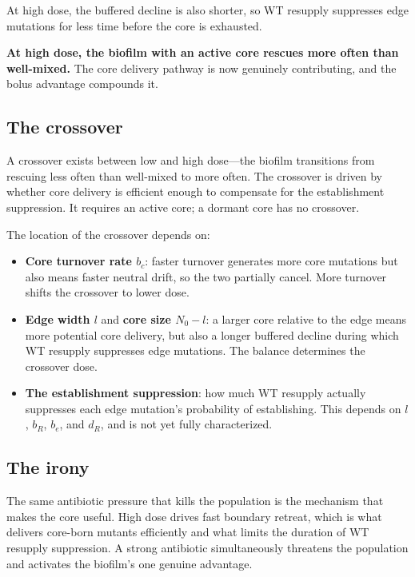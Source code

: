 \documentclass[12pt]{article}
\begin{document}
At high dose, the buffered decline is also shorter, so WT resupply suppresses
edge mutations for less time before the core is exhausted.

\textbf{At high dose, the biofilm with an active core rescues more often
than well-mixed.} The core delivery pathway is now genuinely contributing,
and the bolus advantage compounds it.

\subsection*{The crossover}

A crossover exists between low and high dose---the biofilm transitions from
rescuing less often than well-mixed to more often. The crossover is driven
by whether core delivery is efficient enough to compensate for the
establishment suppression. It requires an active core; a dormant core has
no crossover.

The location of the crossover depends on:
\begin{itemize}
    \item \textbf{Core turnover rate $b_c$}: faster turnover generates more
    core mutations but also means faster neutral drift, so the two partially
    cancel. More turnover shifts the crossover to lower dose.
    \item \textbf{Edge width $l$} and \textbf{core size $N_0 - l$}: a larger
    core relative to the edge means more potential core delivery, but also a
    longer buffered decline during which WT resupply suppresses edge
    mutations. The balance determines the crossover dose.
    \item \textbf{The establishment suppression}: how much WT resupply
    actually suppresses each edge mutation's probability of establishing.
    This depends on $l$, $b_R$, $b_e$, and $d_R$, and is not yet fully
    characterized.
\end{itemize}

\subsection*{The irony}

The same antibiotic pressure that kills the population is the mechanism
that makes the core useful. High dose drives fast boundary retreat, which
is what delivers core-born mutants efficiently and what limits the duration
of WT resupply suppression. A strong antibiotic simultaneously threatens
the population and activates the biofilm's one genuine advantage.
\end{document}
